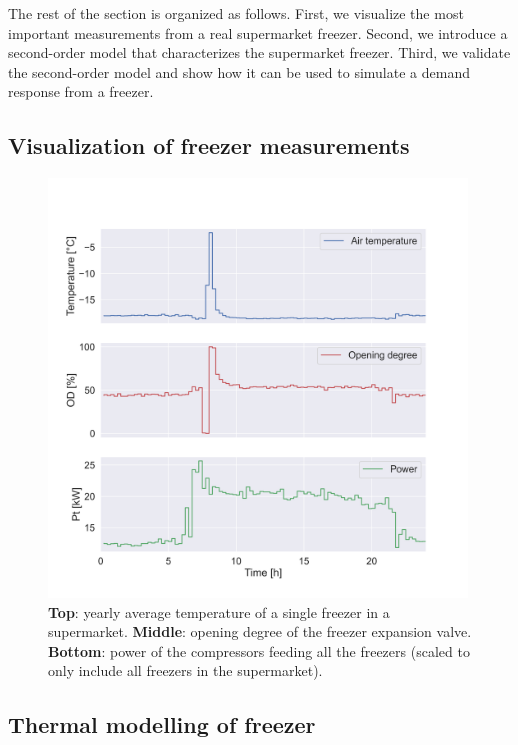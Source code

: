 \documentclass[11pt,a4paper]{article}
\begin{document}
The rest of the section is organized as follows. First, we visualize the most important measurements from a real supermarket freezer. Second, we introduce a second-order model that characterizes the supermarket freezer. Third, we validate the second-order model and show how it can be used to simulate a demand response from a freezer.

\subsection{Visualization of freezer measurements}

\begin{figure}[H]
    \centering
    \includegraphics[width=0.99\textwidth]{figures/tmp_od_Pt.png}
    \caption{\textbf{Top}: yearly average temperature of a single freezer in a supermarket. \textbf{Middle}: opening degree of the freezer expansion valve. \textbf{Bottom}: power of the compressors feeding all the freezers (scaled to only include all freezers in the supermarket).}
    \label{fig:chunk}
\end{figure}

\subsection{Thermal modelling of freezer}
\end{document}
